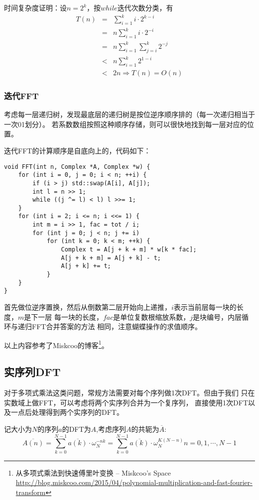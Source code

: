 时间复杂度证明：设$n=2^k$，按$while$迭代次数分类，有
\begin{eqnarray*}
	T(n)&=&\sum_{i=1}^k{i\cdot 2^{k-i}}\\
	&=&n\sum_{i=1}^k{i\cdot 2^{-i}}\\
	&=&n\sum_{i=1}^k{\sum_{j=i}^k{2^{-j}}}\\
	&<&n\sum_{i=1}^k{2^{1-i}}\\
	&<&2n\Rightarrow T(n)=O(n)
\end{eqnarray*}
\subsubsection{迭代FFT}
考虑每一层递归树，发现最底层的递归树是按位逆序顺序排的（每一次递归相当于一次01划分）。
若系数数组按照这种顺序存储，则可以很快地找到每一层对应的位置。

迭代FFT的计算顺序是自底向上的，代码如下：

\begin{lstlisting}
void FFT(int n, Complex *A, Complex *w) {
    for (int i = 0, j = 0; i < n; ++i) {
        if (i > j) std::swap(A[i], A[j]);
        int l = n >> 1;
        while ((j ^= l) < l) l >>= 1;
    }
    for (int i = 2; i <= n; i <<= 1) {
        int m = i >> 1, fac = tot / i;
        for (int j = 0; j < n; j += i)
            for (int k = 0; k < m; ++k) {
                Complex t = A[j + k + m] * w[k * fac];
                A[j + k + m] = A[j + k] - t;
                A[j + k] += t;
            }
    }
}
\end{lstlisting}
首先做位逆序置换，然后从倒数第二层开始向上递推，$i$表示当前层每一块的长度，$m$是下一层
每一块的长度，$fac$是单位复数根缩放系数，$j$是块编号，内层循环与递归FFT合并答案的方法
相同，注意蝴蝶操作的求值顺序。

以上内容参考了Miskcoo的博客\footnote{从多项式乘法到快速傅里叶变换 – Miskcoo's Space
\url{http://blog.miskcoo.com/2015/04/polynomial-multiplication-and-fast-fourier-transform}}。
\subsection{实序列DFT}\label{RDFT}
对于多项式乘法这类问题，常规方法需要对每个序列做1次DFT。但由于我们
只在实数域上做FFT，可以考虑将两个实序列合并为一个复序列，
直接使用1次DFT以及一点后处理得到两个实序列的DFT。

记大小为$N$的序列$a$的DFT为$A$,考虑序列$A$的共轭为$\overline{A}$:
\begin{displaymath}
	\overline{A(n)}=\sum_{k=0}^{N-1}{\overline{a(k)}\cdot\omega_N^{-nk}}=
	\sum_{k=0}^{N-1}{\overline{a(k)}\cdot\omega_N^{K(N-n)}}
	n=0,1,\cdots,N-1
\end{displaymath}

